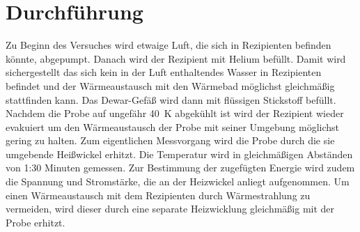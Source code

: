 \section{Durchführung}

Zu Beginn des Versuches wird etwaige Luft, die sich in Rezipienten befinden könnte, abgepumpt. Danach wird der Rezipient mit Helium befüllt. Damit wird sichergestellt das sich kein in der Luft enthaltendes Wasser in Rezipienten befindet und der Wärmeaustausch mit den Wärmebad möglichst gleichmäßig stattfinden kann. Das Dewar-Gefäß wird dann mit flüssigen Stickstoff befüllt. Nachdem die Probe auf ungefähr \SI{40}{\K} abgekühlt ist wird der Rezipient wieder evakuiert um den Wärmeaustausch der Probe mit seiner Umgebung möglichst gering zu halten.
Zum eigentlichen Messvorgang wird die Probe durch die sie umgebende Heißwickel erhitzt. Die Temperatur wird in gleichmäßigen Abständen von 1:30 Minuten gemessen. Zur Bestimmung der zugefügten Energie wird zudem die Spannung und Stromstärke, die an der Heizwickel anliegt aufgenommen. Um einen Wärmeaustausch mit dem Rezipienten durch Wärmestrahlung zu vermeiden, wird dieser durch eine separate Heizwicklung gleichmäßig mit der Probe erhitzt. 